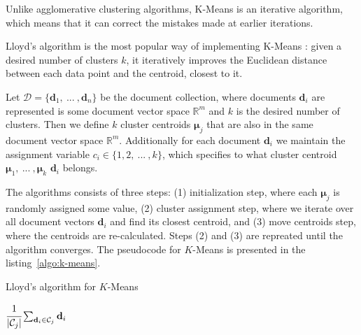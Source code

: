 Unlike agglomerative clustering algorithms, K-Means is an iterative 
algorithm, which means that it can correct the mistakes made 
at earlier iterations. 

Lloyd's algorithm  is the most popular way of implementing K-Means 
\cite{xu2005survey}: given a desired number of clusters $k$, 
it iteratively improves the Euclidean distance between each data 
point and the centroid, closest to it. 


Let $\mathcal D = \{  \mathbf d_1, \ ... \ , \mathbf d_n \}$ be the document 
collection, where documents $\mathbf d_i$ are represented is some document
vector space $\mathbb R^m$ and $k$ is the desired number of clusters. 
Then we define $k$ cluster centroids $\boldsymbol \mu_j$ that are 
also in the same document vector space $\mathbb R^m$. 
Additionally for each document $\mathbf d_i$ we maintain the assignment 
variable $c_i \in \{ 1, 2, \ ... \ , k \}$, which specifies to what 
cluster centroid $\boldsymbol \mu_1, \ ... \ , \boldsymbol \mu_k$ 
$\mathbf d_i$ belongs. 


The algorithms consists of three steps: (1) initialization step, 
where each $\boldsymbol \mu_j$ is randomly assigned some value, 
(2) cluster assignment step, where we iterate over all document vectors
$\mathbf d_i$ and find its closest centroid, and (3)  move centroids step,
where the centroids are re-calculated. Steps (2) and (3) are repreated 
until the algorithm converges. The pseudocode for $K$-Means is presented 
in the listing~\ref{algo:k-means}.


\begin{algorithm}
\caption{Lloyd's algorithm for $K$-Means}
\label{algo:k-means}

\begin{algorithmic}[0]
  \Statex
     
    \EndFor

       
      \EndFor

       
            {$\cfrac{1}{| \mathcal C_j |} \sum_{\mathbf d_i \in \mathcal C_j} \mathbf d_i$}
      \EndFor
    \EndWhile

    \State {}
  \EndFunction
\end{algorithmic}
\end{algorithm}

